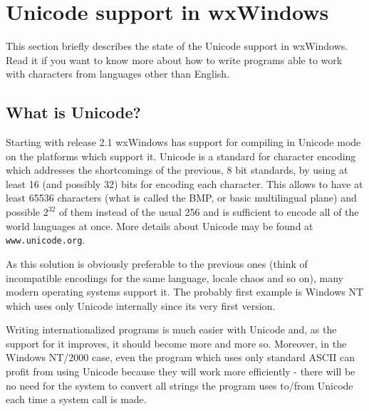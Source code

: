 
\section{Unicode support in wxWindows}\label{unicode}

This section briefly describes the state of the Unicode support in wxWindows.
Read it if you want to know more about how to write programs able to work with
characters from languages other than English.

\subsection{What is Unicode?}

Starting with release 2.1 wxWindows has support for compiling in Unicode mode
on the platforms which support it. Unicode is a standard for character
encoding which addresses the shortcomings of the previous, 8 bit standards, by
using at least 16 (and possibly 32) bits for encoding each character. This
allows to have at least 65536 characters (what is called the BMP, or basic
multilingual plane) and possible $2^{32}$ of them instead of the usual 256 and
is sufficient to encode all of the world languages at once. More details about
Unicode may be found at {\tt www.unicode.org}.


As this solution is obviously preferable to the previous ones (think of
incompatible encodings for the same language, locale chaos and so on), many
modern operating systems support it. The probably first example is Windows NT
which uses only Unicode internally since its very first version.

Writing internationalized programs is much easier with Unicode and, as the
support for it improves, it should become more and more so. Moreover, in the
Windows NT/2000 case, even the program which uses only standard ASCII can profit
from using Unicode because they will work more efficiently - there will be no
need for the system to convert all strings the program uses to/from Unicode
each time a system call is made.

